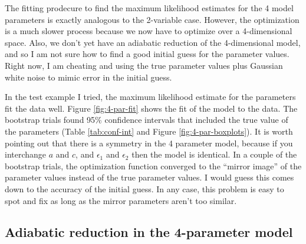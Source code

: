 \documentclass{article}
\begin{document}
The fitting prodecure to find the maximum likelihood estimates for the
4 model parameters is exactly analogous to the 2-variable
case. However, the optimization is a much slower process because we
now have to optimize over a 4-dimensional space. Also, we don't yet
have an adiabatic reduction of the 4-dimensional model, and so I am
not sure how to find a good initial guess for the parameter
values. Right now, I am cheating and using the true parameter values
plus Gaussian white noise to mimic error in the initial guess.

In the test example I tried, the maximum likelihood estimate for the
parameters fit the data well. Figure \ref{fig:4-par-fit} shows the fit
of the model to the data. The bootstrap trials found 95\% confidence
intervals that included the true value of the parameters (Table
\ref{tab:conf-int} and Figure \ref{fig:4-par-boxplots}). It is worth
pointing out that there is a symmetry in the 4 parameter model,
because if you interchange $a$ and $c$, and $\epsilon_1$ and
$\epsilon_2$ then the model is identical. In a couple of the bootstrap
trials, the optimization function converged to the ``mirror image'' of
the parameter values instead of the true parameter values. I would
guess this comes down to the accuracy of the initial guess. In any
case, this problem is easy to spot and fix as long as the mirror
parameters aren't too similar.

\subsection{Adiabatic reduction in the 4-parameter model}
\label{sec:adiab-reduct-4}
\end{document}
